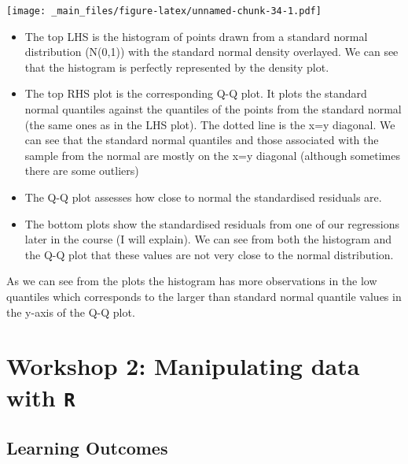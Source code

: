 \documentclass[
]{gitbook}
\providecommand{\tightlist}{%
  \setlength{\itemsep}{0pt}\setlength{\parskip}{0pt}}
\begin{document}
\texttt{[image: \_main\_files/figure-latex/unnamed-chunk-34-1.pdf]}

\begin{itemize}
\tightlist
\item
  The top LHS is the histogram of points drawn from a standard normal distribution (N(0,1)) with the standard normal density overlayed. We can see that the histogram is perfectly represented by the density plot.
\item
  The top RHS plot is the corresponding Q-Q plot. It plots the standard normal quantiles against the quantiles of the points from the standard normal (the same ones as in the LHS plot). The dotted line is the x=y diagonal. We can see that the standard normal quantiles and those associated with the sample from the normal are mostly on the x=y diagonal (although sometimes there are some outliers)
\item
  The Q-Q plot assesses how close to normal the standardised residuals are.
\item
  The bottom plots show the standardised residuals from one of our regressions later in the course (I will explain). We can see from both the histogram and the Q-Q plot that these values are not very close to the normal distribution.
\end{itemize}

As we can see from the plots the histogram has more observations in the low quantiles which corresponds to the larger than standard normal quantile values in the y-axis of the Q-Q plot.


\hypertarget{workshop-2-manipulating-data-with-r}{%
\section{\texorpdfstring{Workshop 2: Manipulating data with \texttt{R}}{Workshop 2: Manipulating data with R}}\label{workshop-2-manipulating-data-with-r}}

\hypertarget{learning-outcomes-2}{%
\subsection{Learning Outcomes}\label{learning-outcomes-2}}
\end{document}
